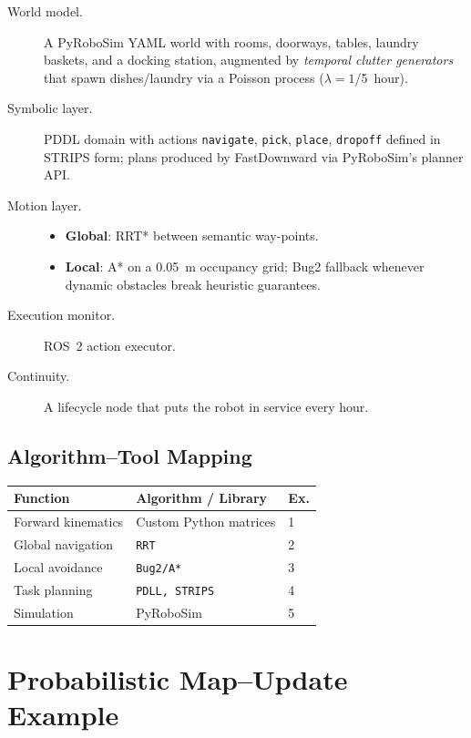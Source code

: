 \documentclass[11pt]{article}
\begin{document}
\begin{description}
\item[World model.]  A PyRoboSim YAML world with rooms, doorways, tables, laundry baskets, and a docking station, augmented by \emph{temporal clutter generators} that spawn dishes/laundry via a Poisson process ($\lambda=1$/5~hour).
\item[Symbolic layer.]  PDDL domain with actions \texttt{navigate}, \texttt{pick}, \texttt{place}, \texttt{dropoff} defined in STRIPS form; plans produced by FastDownward via PyRoboSim's planner API.
\item[Motion layer.]
      \begin{itemize}
        \item \textbf{Global}: RRT* between semantic way-points.
        \item \textbf{Local}: A* on a 0.05~m occupancy grid; Bug2 fallback whenever dynamic obstacles break heuristic guarantees.
      \end{itemize}
\item[Execution monitor.]  ROS~2 action executor.
\item[Continuity.]  A lifecycle node that puts the robot in service every hour.
\end{description}

\subsection{Algorithm--Tool Mapping}

\begin{center}
\begin{tabular}{@{}p{3.3cm}p{4.2cm}p{2cm}@{}}
\toprule
\textbf{Function} & \textbf{Algorithm / Library} & \textbf{Ex.}\\ \midrule
Forward kinematics & Custom Python matrices & 1\\
Global navigation & \texttt{RRT} & 2\\
Local avoidance & \texttt{Bug2/A*}& 3\\
Task planning & \texttt{PDLL, STRIPS} & 4\\
Simulation & PyRoboSim & 5\\ \bottomrule
\end{tabular}
\end{center}

\section{Probabilistic Map--Update Example}
\label{sec:example}
\end{document}
